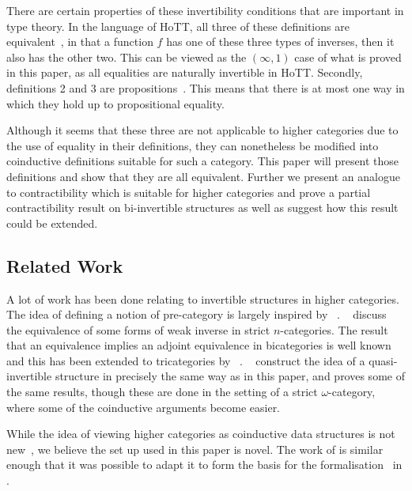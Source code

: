 \documentclass[draft]{article}
\begin{document}
There are certain properties of these invertibility conditions that
are important in type theory. In the language of HoTT, all three of
these definitions are equivalent~\cite[Corollary 4.3.3]{hottbook}, in
that a function \(f\) has one of these three types of inverses, then
it also has the other two. This can be viewed as the \((\infty,1)\)
case of what is proved in this paper, as all equalities are naturally
invertible in HoTT. Secondly, definitions 2 and 3 are
propositions~\cite[Theorem 4.2.13, Theorem 4.3.2]{hottbook}. This
means that there is at most one way in which they hold up to
propositional equality.

Although it seems that these three are not applicable to higher
categories due to the use of equality in their definitions, they can
nonetheless be modified into coinductive definitions suitable for such
a category. This paper will present those definitions and show that
they are all equivalent. Further we present an analogue to
contractibility which is suitable for higher categories and prove a
partial contractibility result on bi-invertible structures as well as
suggest how this result could be extended.

\subsection{Related Work}\label{sec:related}

A lot of work has been done relating to invertible structures in
higher categories. The idea of defining a notion of pre-category is
largely inspired by \citeauthor{Cheng2007}~\cite{Cheng2007}.
\citeauthor{kansangian2009weak}~\cite{kansangian2009weak} discuss the
equivalence of some forms of weak inverse in strict \(n\)-categories.
The result that an equivalence implies an adjoint equivalence in
bicategories is well known and this has been extended to tricategories
by
\citeauthor{gurski2012biequivalences}~\cite{gurski2012biequivalences}.
\citeauthor*{lafont2010folk}~\cite{lafont2010folk} construct the idea
of a quasi-invertible structure in precisely the same way as in this
paper, and proves some of the same results, though these are done in
the setting of a strict \(\omega\)-category, where some of the
coinductive arguments become easier.

While the idea of viewing higher categories as coinductive data
structures is not
new~\cite{cheng2012weak,hirschowitz_et_al:LIPIcs:2015:5166}, we
believe the set up used in this paper is novel. The work of
\citeauthor{hirschowitz_et_al:LIPIcs:2015:5166} is similar enough that
it was possible to adapt it to form the basis for the
formalisation~\cite{rice_agda} in .
\end{document}
